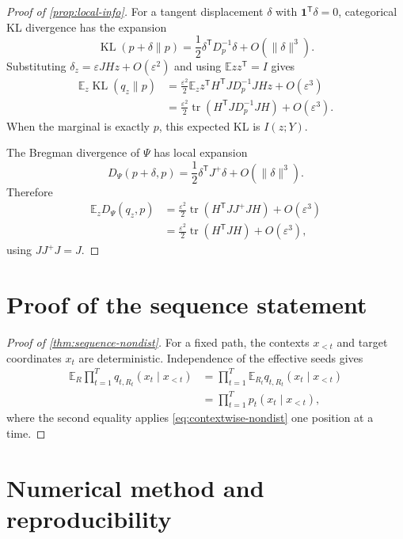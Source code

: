 \documentclass[11pt]{article}
\theoremstyle{definition}
\theoremstyle{remark}
\DeclareMathOperator{\tr}{tr}
\DeclareMathOperator{\KL}{KL}
\newcommand{\E}{\mathbb{E}}
\newcommand{\one}{\mathbf{1}}
\newcommand{\Dp}{D_p}
\newcommand{\trans}{\mathsf{T}}
\begin{document}
\begin{proof}[Proof of \cref{prop:local-info}]
For a tangent displacement $\delta$ with $\one^\trans\delta=0$, categorical KL divergence has the expansion
\begin{equation}
\KL(p+\delta\|p)
=\frac12\delta^\trans\Dp^{-1}\delta+O(\|\delta\|^3).
\end{equation}
Substituting $\delta_z=\varepsilon JHz+O(\varepsilon^2)$ and using $\E zz^\trans=I$ gives
\begin{align}
\E_z\KL(q_z\|p)
&=\frac{\varepsilon^2}{2}
\E_z z^\trans H^\trans J\Dp^{-1}JHz+O(\varepsilon^3)\\
&=\frac{\varepsilon^2}{2}
\tr(H^\trans J\Dp^{-1}JH)+O(\varepsilon^3).
\end{align}
When the marginal is exactly $p$, this expected KL is $I(z;Y)$.

The Bregman divergence of $\Psi$ has local expansion
\begin{equation}
D_\Psi(p+\delta,p)
=\frac12\delta^\trans J^+\delta+O(\|\delta\|^3).
\end{equation}
Therefore
\begin{align}
\E_zD_\Psi(q_z,p)
&=\frac{\varepsilon^2}{2}
\tr(H^\trans J J^+JH)+O(\varepsilon^3)\\
&=\frac{\varepsilon^2}{2}
\tr(H^\trans JH)+O(\varepsilon^3),
\end{align}
using $JJ^+J=J$.
\end{proof}

\section{Proof of the sequence statement}
\label{app:sequence-proof}

\begin{proof}[Proof of \cref{thm:sequence-nondist}]
For a fixed path, the contexts $x_{<t}$ and target coordinates $x_t$ are deterministic. Independence of the effective seeds gives
\begin{align}
\E_R\prod_{t=1}^T q_{t,R_t}(x_t\mid x_{<t})
&=\prod_{t=1}^T\E_{R_t}q_{t,R_t}(x_t\mid x_{<t})\\
&=\prod_{t=1}^T p_t(x_t\mid x_{<t}),
\end{align}
where the second equality applies \eqref{eq:contextwise-nondist} one position at a time.
\end{proof}

\section{Numerical method and reproducibility}
\label{app:reproducibility}
\end{document}
